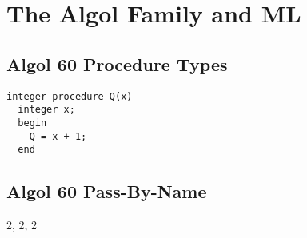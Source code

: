 \chapter{The Algol Family and ML}

\section{Algol 60 Procedure Types}
\begin{verbatim}
integer procedure Q(x)
  integer x;
  begin
    Q = x + 1;
  end
\end{verbatim}


\section{Algol 60 Pass-By-Name}
2, 2, 2